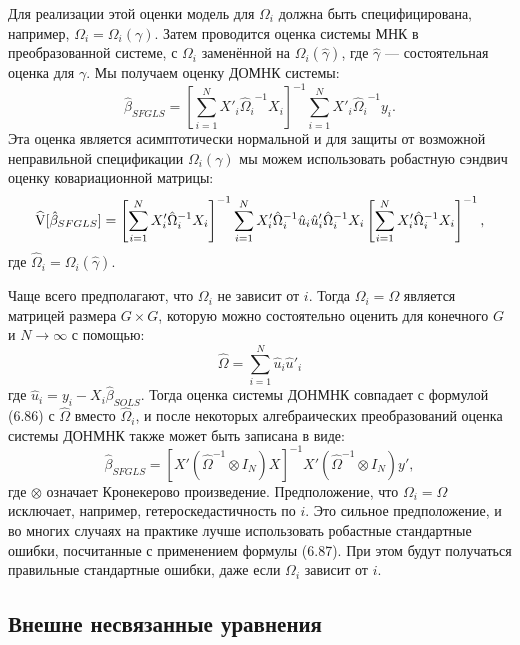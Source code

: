 Для реализации этой оценки модель для $\Omega_i$ должна быть специфицирована, например, $\Omega_i=\Omega_i(\gamma)$. Затем проводится оценка системы МНК в преобразованной системе, с $\Omega_i$ заменённой на $\Omega_i(\hat{\gamma})$, где $\hat{\gamma}$ --- состоятельная оценка для $\gamma$. Мы получаем оценку ДОМНК системы:
\begin{equation}
\hat{\beta}_{SFGLS} = \left[ \sum_{i=1}^N X'_i {\hat{\Omega}_i}^{-1} X_i \right]^{-1} \sum_{i=1}^N X'_i {\hat{\Omega}_i}^{-1} y_i.
\end{equation}
Эта оценка является асимптотически нормальной и для защиты от возможной неправильной спецификации $\Omega_i(\gamma)$ мы можем использовать робастную сэндвич оценку ковариационной матрицы:
\begin{equation}
\widehat{\mathrm{V}}[\hat{\beta}_{SFGLS}]= \left[ \sum_{i=1}^N X'_i {\hat{\Omega}_i}^{-1} X_i \right]^{-1} \sum_{i=1}^N X'_i {\hat{\Omega}_i}^{-1} \hat{u}_i \hat{u}'_i  {\hat{\Omega}_i}^{-1} X_i  \left[ \sum_{i=1}^N X'_i {\hat{\Omega}_i}^{-1} X_i \right]^{-1},
\end{equation}
где $\hat{\Omega}_i=\Omega_i(\hat{\gamma})$.

Чаще всего предполагают, что  $\Omega_i$ не зависит от $i$. Тогда $\Omega_i=\Omega$ является матрицей размера $G \times G$, которую можно состоятельно оценить для конечного $G$ и $N \rightarrow \infty$ с помощью:
\begin{equation}
\hat{\Omega}= \sum_{i=1}^N \hat{u}_i \hat{u}'_i 
\end{equation}
где $\hat{u}_i=y_i-X_i \hat{\beta}_{SOLS}$. Тогда оценка системы ДОНМНК совпадает с формулой (6.86) с $\hat{\Omega}$ вместо $\hat{\Omega}_i$, и после некоторых алгебраических преобразований оценка системы ДОНМНК также может быть записана в виде:
\begin{equation}
\hat{\beta}_{SFGLS} = \left[ X' \left( {\hat{\Omega}}^{-1} \otimes I_N \right) X \right]^{-1} X' \left( {\hat{\Omega}}^{-1} \otimes I_N \right) y',
\end{equation}
где $\otimes$ означает Кронекерово произведение. Предположение, что $\Omega_i=\Omega$ исключает, например, гетероскедастичность по $i$. Это сильное предположение, и во многих случаях на практике лучше использовать робастные стандартные ошибки, посчитанные с применением формулы (6.87). При этом будут получаться  правильные стандартные ошибки, даже если $\Omega_i$ зависит от $i$.

\subsection{Внешне несвязанные уравнения}

